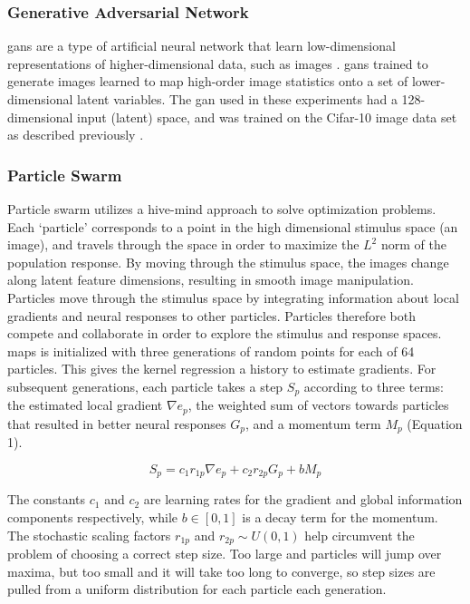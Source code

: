 \subsubsection*{Generative Adversarial Network}
\label{methods:gan}
\Glspl{gan} are a type of artificial neural network that learn low-dimensional representations of higher-dimensional data, such as images \cite{Karras2019}. \glspl{gan} trained to generate images learned to map high-order image statistics onto a set of lower-dimensional latent variables. The \gls{gan} used in these experiments had a 128-dimensional input (latent) space, and was trained on the Cifar-10 image data set as described previously \cite{Fruend2018}. 

\subsubsection{Particle Swarm}
Particle swarm utilizes a hive-mind approach to solve optimization problems. Each `particle’ corresponds to a point in the high dimensional stimulus space (an image), and travels through the space in order to maximize the $L^2$ norm of the population response. By moving through the stimulus space, the images change along latent feature dimensions, resulting in smooth image manipulation. Particles move through the stimulus space by integrating information about local gradients and neural responses to other particles. Particles therefore both compete and collaborate in order to explore the stimulus and response spaces. \\
\gls{maps} is initialized with three generations of random points for each of 64 particles. This gives the kernel regression a history to estimate gradients. For subsequent generations, each particle takes a step $S_p$ according to three terms: the estimated local gradient $\nabla e_p$,  the weighted sum of vectors towards particles that resulted in better neural responses $G_p$, and a momentum term $M_p$ (Equation 1).

\begin{equation}
	S_p= c_1 r_{1p} \nabla e_p+ c_2  r_{2p} G_p+b M_p
\end{equation}

The constants $c_1$ and $c_2$ are learning rates for the gradient and global information components respectively, while $b \in [0,1]$ is a decay term for the momentum. The stochastic scaling factors $r_{1p}$ and $r_{2p} \sim U(0,1)$ help circumvent the problem of choosing a correct step size. Too large and particles will jump over maxima, but too small and it will take too long to converge, so step sizes are pulled from a uniform distribution for each particle each generation.

